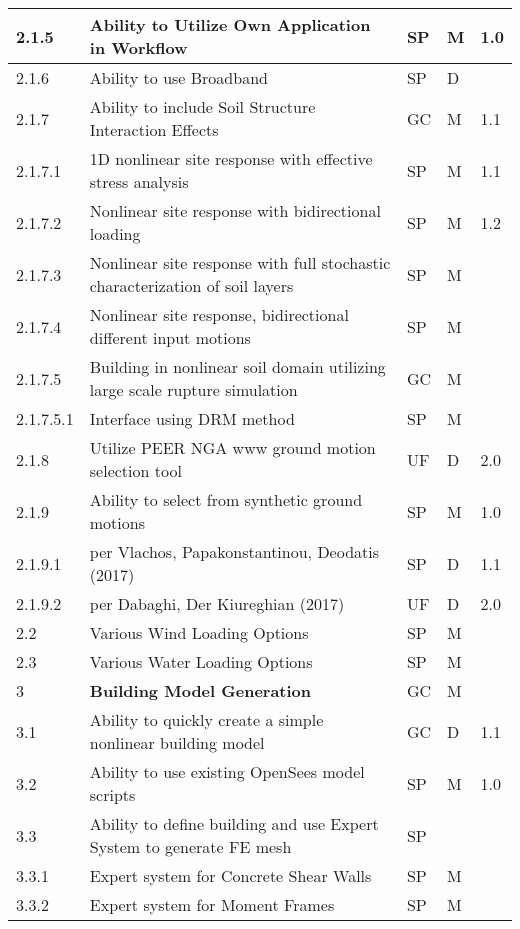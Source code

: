 \begin{longtable}{| p{} | p{} | p{} | p{} |  p{} |}
      2.1.5 & Ability to Utilize Own Application in Workflow & SP & M & 1.0 \\ \hline
      2.1.6 & Ability to use Broadband & SP & D &  \\ \hline
      2.1.7  & Ability to include Soil Structure Interaction Effects & GC & M & 1.1 \\  \hline
      2.1.7.1  & 1D nonlinear site response with effective stress analysis & SP & M & 1.1  \\ \hline
      2.1.7.2  & Nonlinear site response with bidirectional loading & SP & M & 1.2 \\  \hline
      2.1.7.3  & Nonlinear site response with full stochastic characterization of soil layers & SP & M &  \\ \hline
      2.1.7.4 & Nonlinear site response, bidirectional different input motions  & SP & M &  \\  \hline
      2.1.7.5 & Building in nonlinear soil domain utilizing large scale rupture simulation & GC  & M &  \\  \hline
      2.1.7.5.1 & Interface using DRM method  & SP  & M &  \\  \hline
      2.1.8 & Utilize PEER NGA www ground motion selection tool  & UF & D & 2.0 \\ \hline
      2.1.9 & Ability to select from synthetic ground motions & SP & M & 1.0  \\
      2.1.9.1 & per Vlachos, Papakonstantinou, Deodatis (2017) & SP & D & 1.1  \\ 
      2.1.9.2 & per Dabaghi, Der Kiureghian (2017) & UF & D & 2.0 \\ \hline
      2.2 & Various Wind Loading Options & SP & M &   \\ \hline
      2.3 & Various Water Loading Options & SP & M &   \\ \hline
  3 & \textbf{Building Model Generation} & GC & M &  \\ \hline
  3.1 & Ability to quickly create a simple nonlinear building model & GC & D & 1.1 \\ \hline
  3.2 & Ability to use existing OpenSees model scripts & SP & M & 1.0 \\ \hline
  3.3  & Ability to define building and use Expert System to generate FE mesh & SP & &  \\ \hline
  3.3.1 & Expert system for Concrete Shear Walls & SP & M &  \\ \hline
  3.3.2 & Expert system for Moment Frames & SP & M &  \\ \hline

\end{longtable}
